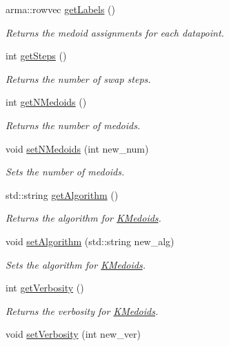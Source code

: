 \begin{DoxyCompactItemize}
arma\+::rowvec \hyperlink{classKMedoids_a89474787892880381e4d0282de541d03}{get\+Labels} ()
\begin{DoxyCompactList}\small\item\em Returns the medoid assignments for each datapoint. \end{DoxyCompactList}\item 
int \hyperlink{classKMedoids_a2c8d55468ebe909229ea7bcdb50e8351}{get\+Steps} ()
\begin{DoxyCompactList}\small\item\em Returns the number of swap steps. \end{DoxyCompactList}\item 
int \hyperlink{classKMedoids_ad738dc6b5a2dafa1ff4aeab807d6407d}{get\+N\+Medoids} ()
\begin{DoxyCompactList}\small\item\em Returns the number of medoids. \end{DoxyCompactList}\item 
void \hyperlink{classKMedoids_ad28860f50c0b5a4968f99d103b3de06f}{set\+N\+Medoids} (int new\+\_\+num)
\begin{DoxyCompactList}\small\item\em Sets the number of medoids. \end{DoxyCompactList}\item 
std\+::string \hyperlink{classKMedoids_a01a1bf63fdd2cd8b389c3f1c0619388f}{get\+Algorithm} ()
\begin{DoxyCompactList}\small\item\em Returns the algorithm for \hyperlink{classKMedoids}{K\+Medoids}. \end{DoxyCompactList}\item 
void \hyperlink{classKMedoids_a1a6dbc45f5d83bded48bf86cbc2690ad}{set\+Algorithm} (std\+::string new\+\_\+alg)
\begin{DoxyCompactList}\small\item\em Sets the algorithm for \hyperlink{classKMedoids}{K\+Medoids}. \end{DoxyCompactList}\item 
int \hyperlink{classKMedoids_a8d5372adbed828602f9311dbe9c70198}{get\+Verbosity} ()
\begin{DoxyCompactList}\small\item\em Returns the verbosity for \hyperlink{classKMedoids}{K\+Medoids}. \end{DoxyCompactList}\item 
void \hyperlink{classKMedoids_a8d03726bbd66ffc6d2c202d2a3cf40d5}{set\+Verbosity} (int new\+\_\+ver)

\end{DoxyCompactItemize}
